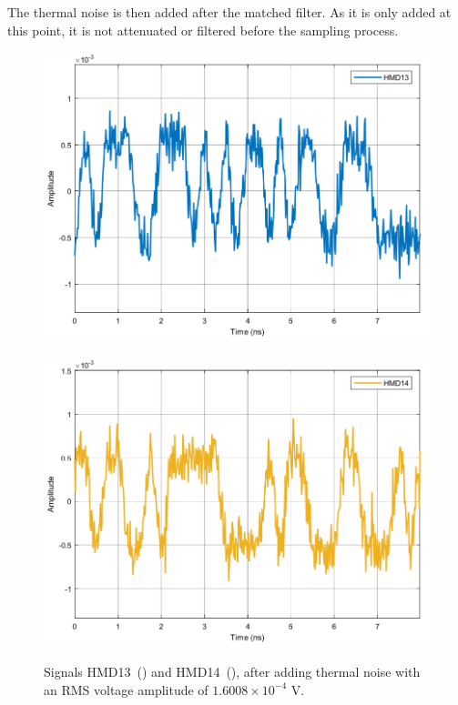 The thermal noise is then added after the matched filter. As it is only added 
at this point, it is not attenuated or filtered before the sampling process.

	\begin{figure}[H]
	\centering
	\begin{minipage}{0.45\textwidth}
		\centering
		\includegraphics[width=1\textwidth]		
		{./sdf/m_qam_system/figures/simulations/02_thermal/HMD13.pdf}
		\subcaption{}\label{fig:sim_thermalHmd13}
	\end{minipage}
	\begin{minipage}{0.45\textwidth}
		\centering
		\includegraphics[width=1\textwidth]
		{sdf/m_qam_system/figures/simulations/02_thermal/HMD14.pdf}
		\subcaption{}\label{fig:sim_thermalHmd14}
	\end{minipage}
	\caption{Signals HMD13~() and 
		HMD14~(), after adding thermal 
		noise with an RMS voltage amplitude of $1.6008 \times 10^{-4}$ 
		V.}\label{fig:sim_thermalHmd1314}
\end{figure}

